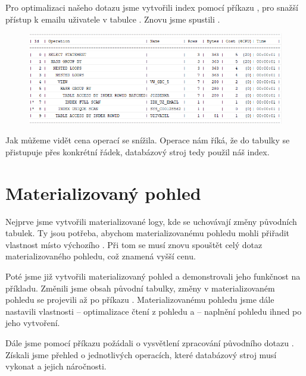 \documentclass[12pt, a4paper, titlepage]{article}
\begin{document}
{{{Pro optimalizaci našeho dotazu jsme vytvořili index pomocí příkazu , pro snažší přístup k emailu uživatele v tabulce . Znovu jsme spustili .

\begin{center}
\begin{figure}[h]
    \includegraphics[scale=0.8]{ep_po.png}
\end{figure}
\end{center}

Jak můžeme vidět cena operací se snížila. Operace  nám říká, že do tabulky se přistupuje přes konkrétní řádek, databázový stroj tedy použil náš index.
\medskip


\section{Materializovaný pohled}

Nejprve jsme vytvořili materializované logy, kde se uchovávají změny původních tabulek. Ty jsou potřeba, abychom materializovanému pohledu mohli přiřadit vlastnost  místo výchozího . Při tom se musí znovu spouštět celý dotaz materializovaného pohledu, což znamená vyšší cenu.
\bigskip

Poté jsme již vytvořili materializovaný pohled a demonstrovali jeho funkčnost na příkladu. Změnili jsme obsah původní tabulky, změny v materializovaném pohledu se projevili až po příkazu . Materializovanému pohledu jsme dále nastavili vlastnosti  -- optimalizace čtení z pohledu a  -- naplnění pohledu ihned po jeho vytvoření.
\bigskip

Dále jsme pomocí příkazu  požádali o vysvětlení zpracování původního dotazu . Získali jsme přehled o jednotlivých operacích, které databázový stroj musí vykonat a jejich náročnosti.

}}}
\end{document}
